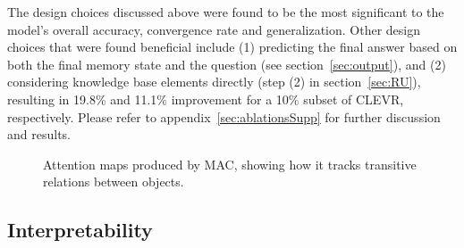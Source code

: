 \documentclass[fleqn]{article}
\newcommand{\secref}[1]{section~\ref{sec:#1}}
\newcommand{\appref}[1]{appendix~\ref{sec:#1}}
\begin{document}
The design choices discussed above were found to be the most significant to the model's overall accuracy, convergence rate and generalization. Other design choices that were found  beneficial include (1) predicting the final answer based on both the final memory state and the question (see \secref{output}), and (2) considering knowledge base elements directly (step (2) in \secref{RU}), resulting in 19.8\%  and 11.1\% improvement for a 10\% subset of CLEVR, respectively. Please refer to \appref{ablationsSupp} for further discussion and results.
\label{sec:ablations}

\begin{wrapfigure}[20]{r}{0.3\textwidth}
\vspace*{-10mm}
\begin{minipage}{0.12\textwidth}
\centering
\vspace*{4mm}
\end{minipage}
\begin{minipage}{0.13\textwidth}
\noindent
\centering
{}
\vspace{-2mm}
\vspace{-2mm}
\vspace{-2mm}
\end{minipage}

\scriptsize 

\caption{Attention maps produced by MAC, showing how it tracks transitive relations between objects.}
\label{int_example2}

\end{wrapfigure} 

\subsection{Interpretability}
\end{document}
